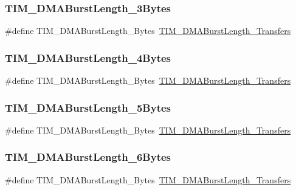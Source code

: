 \subsubsection{\texorpdfstring{TIM\_DMABurstLength\_3Bytes}{TIM\_DMABurstLength\_3Bytes}}
{\footnotesize\ttfamily \#define T\+I\+M\+\_\+\+D\+M\+A\+Burst\+Length\+\_\+Bytes~\mbox{\hyperlink{group___t_i_m___d_m_a___burst___length_ga3a99863a0925e0cc9a11b91aade66f11}{T\+I\+M\+\_\+\+D\+M\+A\+Burst\+Length\+\_\+Transfers}}}

\mbox{\label{group___t_i_m___legacy_ga620ce560a1d7a6d6769cacd2a2ead48d}} 
\subsubsection{\texorpdfstring{TIM\_DMABurstLength\_4Bytes}{TIM\_DMABurstLength\_4Bytes}}
{\footnotesize\ttfamily \#define T\+I\+M\+\_\+\+D\+M\+A\+Burst\+Length\+\_\+Bytes~\mbox{\hyperlink{group___t_i_m___d_m_a___burst___length_ga84bfeb309593a1ac580e233bf7514b36}{T\+I\+M\+\_\+\+D\+M\+A\+Burst\+Length\+\_\+Transfers}}}

\mbox{\label{group___t_i_m___legacy_gaf9ac4a4cfd3dcfb7ba859898e702c881}} 
\subsubsection{\texorpdfstring{TIM\_DMABurstLength\_5Bytes}{TIM\_DMABurstLength\_5Bytes}}
{\footnotesize\ttfamily \#define T\+I\+M\+\_\+\+D\+M\+A\+Burst\+Length\+\_\+Bytes~\mbox{\hyperlink{group___t_i_m___d_m_a___burst___length_ga44f8aa51fbe8887a5f3c37a0e776902c}{T\+I\+M\+\_\+\+D\+M\+A\+Burst\+Length\+\_\+Transfers}}}

\mbox{\label{group___t_i_m___legacy_ga7a9cc659b4fc010a31815254f6b57e3f}} 
\subsubsection{\texorpdfstring{TIM\_DMABurstLength\_6Bytes}{TIM\_DMABurstLength\_6Bytes}}
{\footnotesize\ttfamily \#define T\+I\+M\+\_\+\+D\+M\+A\+Burst\+Length\+\_\+Bytes~\mbox{\hyperlink{group___t_i_m___d_m_a___burst___length_ga8be40a21654eea72e9c1bf9922675b22}{T\+I\+M\+\_\+\+D\+M\+A\+Burst\+Length\+\_\+Transfers}}}

